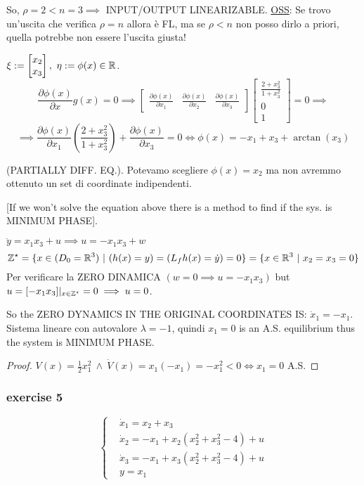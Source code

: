 So, $\rho=2<n=3 \implies$ INPUT/OUTPUT LINEARIZABLE. \underline{OSS}: Se trovo un'uscita che verifica $\rho=n$ allora è FL, ma se $\rho<n$ non posso dirlo a priori, quella potrebbe non essere l'uscita giusta!

$\xi := \begin{bmatrix}x_2\\x_3\end{bmatrix},\ \eta := \phi(x) \in \mathbb{R}$.
\[
	\frac{\partial{\phi(x)}}{\partial{x}}g(x) = 0 \implies \begin{bmatrix}\frac{\partial{\phi(x)}}{\partial{x_1}}&\frac{\partial{\phi(x)}}{\partial{x_2}}&\frac{\partial{\phi(x)}}{\partial{x_3}}\end{bmatrix}\begin{bmatrix}\frac{2+x_3^2}{1+x_3^2}\\0\\1\end{bmatrix} = 0 \implies
\]
\[
	\implies \frac{\partial{\phi(x)}}{\partial{x_1}}(\frac{2+x_3^2}{1+x_3^2}) + \frac{\partial{\phi(x)}}{\partial{x_3}} = 0 \iff \phi(x) = -x_1 + x_3 + \arctan(x_3)
\]

(PARTIALLY DIFF. EQ.). Potevamo scegliere $\phi(x)=x_2$ ma non avremmo ottenuto un set di coordinate indipendenti.

[If we won't solve the equation above there is a method to find if the sys. is MINIMUM PHASE].

$\ddot{y} = x_1x_3 + u \implies u = -x_1x_3 + w$
\[
	\mathbb{Z}^\star = \{x \in (D_0=\mathbb{R}^3)\ |\ (h(x)=y) = (L_fh(x)=\dot{y}) = 0\} = \{x \in \mathbb{R}^3\ |\ x_2=x_3=0\}
\]	
Per verificare la ZERO DINAMICA $(w=0 \implies u=-x_1x_3)$ but $u=[-x_1x_3]|_{x\in\mathbb{Z}^\star} = 0 \implies u = 0$.

So the ZERO DYNAMICS IN THE ORIGINAL COORDINATES IS:
$\dot{x}_1 = -x_1$. Sistema lineare con autovalore $\lambda=-1$, quindi $x_1=0$ is an A.S. equilibrium thus the system is MINIMUM PHASE.

\begin{proof}
$V(x) = \frac{1}{2}x_1^2\ \land\ \dot{V}(x) = x_1(-x_1) = -x_1^2 < 0 \iff x_1=0$ A.S.
\end{proof}

\subsubsection{exercise 5}

\[
	\left\{
	\begin{aligned}
	&\dot{x}_1 = x_2 + x_3 \\
	&\dot{x}_2 = -x_1 + x_2(x_2^2 + x_3^2 - 4) + u \\
	&\dot{x}_3 = -x_1 + x_3(x_2^2 + x_3^2 - 4) + u \\
	&y = x_1
	\end{aligned}
	\right.
\]

